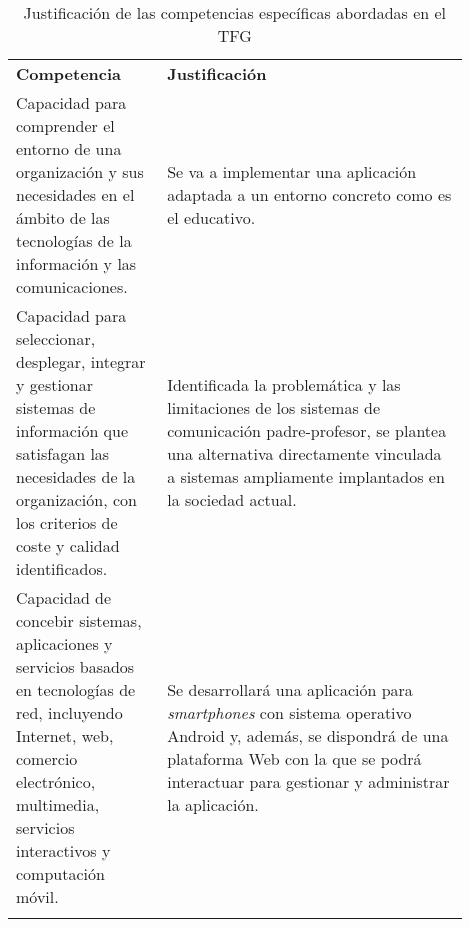 \documentclass{pre-tfg}
\begin{document}
\begin{table}[hp]
	\centering
	\caption{Justificación de las competencias específicas abordadas en el TFG}
	\label{tab:competencias}
	
	\begin{tabular}{p{0.3\linewidth}p{0.6\linewidth}}
		\textbf{Competencia} & \textbf{Justificación} \\
		
			Capacidad para comprender el entorno de una organización y sus necesidades en el
			ámbito de las tecnologías de la información y las comunicaciones.
			&
			Se va a implementar una aplicación adaptada a un entorno concreto como es el educativo. \\
			
			Capacidad para seleccionar, desplegar, integrar y gestionar sistemas de información
			que satisfagan las necesidades de la organización, con los criterios de coste y calidad
			identificados.
			&
			Identificada la problemática y las limitaciones de los sistemas de comunicación padre-profesor, se plantea una alternativa directamente vinculada a sistemas ampliamente implantados en la sociedad actual. \\
			
			Capacidad de concebir sistemas, aplicaciones y servicios basados en tecnologías de
			red, incluyendo Internet, web, comercio electrónico, multimedia, servicios interactivos
			y computación móvil.
			& 
			Se desarrollará una aplicación para \textit{smartphones} con sistema operativo Android y, además, se dispondrá de una plataforma Web con la que se podrá interactuar para gestionar y administrar la aplicación.\\
			& 
			\\
			
	\end{tabular}

\end{table}
\end{document}
